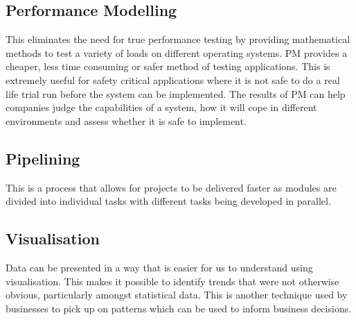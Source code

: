 \documentclass[a4paper,11pt, twocolumn]{article}
\begin{document}
\subsection{Performance Modelling}
This eliminates the need for true performance testing by providing mathematical methods to test a variety of loads on different operating systems. PM provides a cheaper, less time consuming or safer method of testing applications. This is extremely useful for safety critical applications where it is not safe to do a real life trial run before the system can be implemented. The results of PM can help companies judge the capabilities of a system, how it will cope in different environments and assess whether it is safe to implement. 
\subsection{Pipelining}
This is a process that allows for projects to be delivered faster as modules are divided into individual tasks with different tasks being developed in parallel.
\subsection{Visualisation}
Data can be presented in a way that is easier for us to understand using visualisation. This makes it possible to identify trends that were not otherwise obvious, particularly amongst statistical data. This is another technique used by businesses to pick up on patterns which can be used to inform business decisions. 
\end{document}
